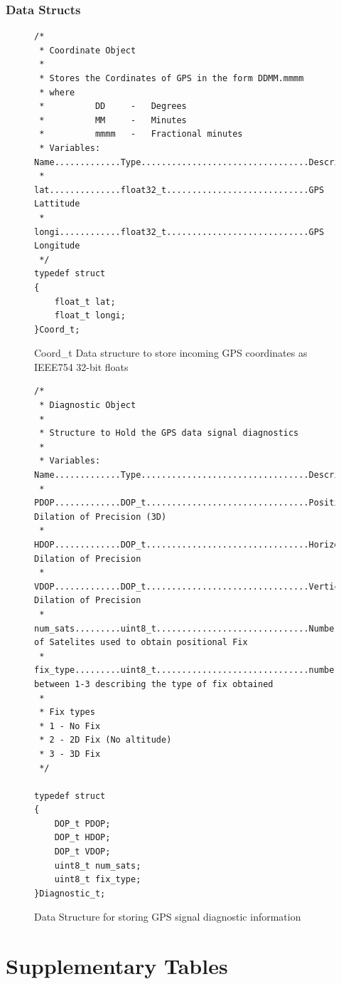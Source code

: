 \subsection{Data Structs}
\begin{figure}[H]
    \centering
\begin{lstlisting}
/*
 * Coordinate Object
 *
 * Stores the Cordinates of GPS in the form DDMM.mmmm
 * where 
 *          DD     -   Degrees
 *          MM     -   Minutes
 *          mmmm   -   Fractional minutes
 * Variables:	Name.............Type.................................Description
 * 				lat..............float32_t............................GPS Lattitude
 * 				longi............float32_t............................GPS Longitude
 */
typedef struct
{
	float_t lat;
	float_t longi;
}Coord_t;
\end{lstlisting}    
    \caption{Coord\_t Data structure to store incoming GPS coordinates as IEEE754 32-bit floats}
    \label{fig:data_coord_t}
\end{figure}

\begin{figure}[H]
    \centering
\begin{lstlisting}
/*
 * Diagnostic Object
 *
 * Structure to Hold the GPS data signal diagnostics
 *
 * Variables:	Name.............Type.................................Description
 * 				PDOP.............DOP_t................................Positional Dilation of Precision (3D)
 * 				HDOP.............DOP_t................................Horizontal Dilation of Precision
 * 				VDOP.............DOP_t................................Vertical   Dilation of Precision
 * 				num_sats.........uint8_t..............................Number of Satelites used to obtain positional Fix
 * 				fix_type.........uint8_t..............................number between 1-3 describing the type of fix obtained
 *
 * Fix types
 * 1 - No Fix
 * 2 - 2D Fix (No altitude)
 * 3 - 3D Fix
 */

typedef struct
{
	DOP_t PDOP;
	DOP_t HDOP;
	DOP_t VDOP;
	uint8_t num_sats;
	uint8_t fix_type;
}Diagnostic_t;
\end{lstlisting}
    \caption{Data Structure for storing GPS signal diagnostic information}
    \label{fig:data_Diagnostic_t}
\end{figure}


\chapter{Supplementary Tables}

